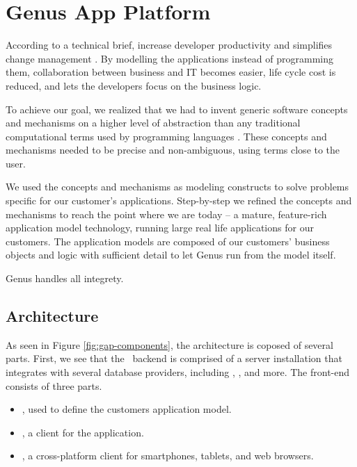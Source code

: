 \chapter{Genus App Platform}
\label{chap:Genus App Platform}
According to a technical brief, \gap increase developer productivity and simplifies change management \cite{tech-brief-gap}. By modelling the applications instead of programming them, collaboration between business and IT becomes easier, life cycle cost is reduced, and lets the developers focus on the business logic.

To achieve our goal, we realized that we had to invent generic software concepts and mechanisms on a higher level of abstraction than any traditional computational terms used by programming languages \cite{noauthor_undated-qy}. These concepts and mechanisms needed to be precise and non-ambiguous, using terms close to the user.
 
We used the concepts and mechanisms as modeling constructs to solve problems specific for our customer’s applications. Step-by-step we refined the concepts and mechanisms to reach the point where we are today – a mature, feature-rich application model technology, running large real life applications for our customers. The application models are composed of our customers' business objects and logic with sufficient detail to let Genus run from the model itself.
 
Genus handles all integrety.

\section{Architecture}
\label{sec:Architecture}
As seen in Figure \ref{fig:gap-components}, the architecture is coposed of several parts. First, we see that the \gap~backend is comprised of a server installation that integrates with several database providers, including , ,  and more. The front-end consists of three parts.

\begin{itemize}
    \item {}, used to define the customers application model.
    \item {}, a  client for the application.
    \item {}, a cross-platform client for smartphones, tablets, and web browsers.
\end{itemize}

